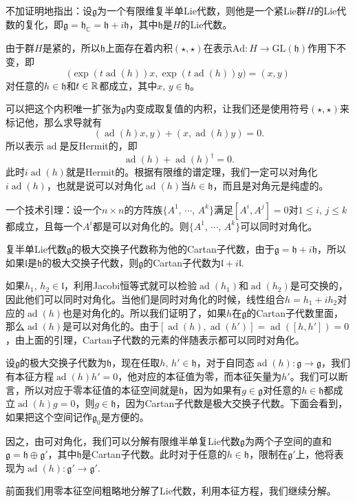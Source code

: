 \documentclass[9pt]{extarticle}
\newcommand{\cc}{\mathbb{C}}
\newcommand{\lag}{{\mathfrak{g}}}
\DeclareMathOperator{\ad}{ad}
\begin{document}
\theo 不加证明地指出：设$\lag$为一个有限维复半单Lie代数，则他是一个紧Lie群$H$的Lie代数的复化，即$\lag=\mathfrak{h}_{\cc}=\mathfrak{h}+i\mathfrak{h}$，其中$\mathfrak{h}$是$H$的Lie代数。

由于群$H$是紧的，所以$\mathfrak{h}$上面存在着内积$(\star,\star)$在表示$\mathrm{Ad}:H\to \mathrm{GL}(\mathfrak{h})$作用下不变，即
\[
	\bigl(\exp(t\ad(h))x,\exp(t\ad(h))y\bigr)=(x,y)
\]
对任意的$h\in\mathfrak{h}$和$t\in \mathbb{R}$都成立，其中$x$, $y\in\mathfrak{h}$。

可以把这个内积唯一扩张为$\lag$内变成取复值的内积，让我们还是使用符号$(\star,\star)$来标记他，那么求导就有
\[
	(\ad(h)x,y)+(x,\ad(h)y)=0.
\]
所以表示$\ad$是反Hermit的，即
\[
	\ad(h)+\ad(h)^\dag=0.
\]
此时$i\ad(h)$就是Hermit的。根据有限维的谱定理，我们一定可以对角化$i\ad(h)$，也就是说可以对角化$\ad(h)$当$h\in \mathfrak{h}$，而且是对角元是纯虚的。

\lem 一个技术引理：设一个$n\times n$的方阵族$\{A^1$, $\cdots$, $A^k\}$满足$[A^i,A^j]=0$对$1\leq i$, $j\leq k$都成立，且每一个$A^i$都是可以对角化的。则$\{A^1$, $\cdots$, $A^k\}$可以同时对角化。

\para 复半单Lie代数$\lag$的极大交换子代数称为他的Cartan子代数，由于$\lag=\mathfrak{h}+i\mathfrak{h}$，所以如果$\mathfrak{l}$是$\mathfrak{h}$的极大交换子代数，则$\lag$的Cartan子代数为$\mathfrak{l}+i\mathfrak{l}$.

如果$h_1$, $h_2\in\mathfrak{l}$，利用Jacobi恒等式就可以检验$\ad(h_1)$和$\ad(h_2)$是可交换的，因此他们可以同时对角化。当他们是同时对角化的时候，线性组合$h=h_1+ih_2$对应的$\ad(h)$也是对角化的。所以我们证明了，如果$h$在$\lag$的Cartan子代数里面，那么$\ad(h)$是可以对角化的。由于$[\ad(h),\ad(h')]=\ad([h,h'])=0$，由上面的引理，Cartan子代数的元素的伴随表示都可以同时对角化。

\para 设$\lag$的极大交换子代数为$\mathfrak{h}$，现在任取$h$, $h'\in \mathfrak{h}$，对于自同态$\ad(h):\lag\to \lag$，我们有本征方程$\ad(h)h'=0$，他对应的本征值为零，而本征矢量为$h'$。我们可以断言，所以对应于零本征值的本征空间就是$\mathfrak{h}$，因为如果有$g\in \lag$对任意的$h\in \mathfrak{h}$都成立$\ad(h)g=0$，则$g\in \mathfrak{h}$，因为Cartan子代数是极大交换子代数。下面会看到，如果把这个空间记作$\lag_0$是方便的。

因之，由可对角化，我们可以分解有限维半单复Lie代数$\lag$为两个子空间的直和$\lag=\mathfrak{h}\oplus \lag'$，其中$\mathfrak{h}$是Cartan子代数。此时对于任意的$h\in \mathfrak{h}$，限制在$\lag'$上，他将表现为$\ad(h):\lag'\to\lag'$.

\para 前面我们用零本征空间粗略地分解了Lie代数，利用本征方程，我们继续分解。
\end{document}
